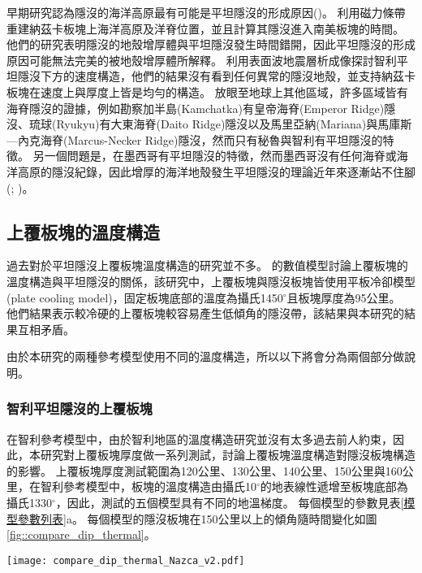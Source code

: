 早期研究認為隱沒的海洋高原最有可能是平坦隱沒的形成原因(\citealp{gutscher2002andean})。
\citet{Skinner2013}利用磁力條帶重建納茲卡板塊上海洋高原及洋脊位置，並且計算其隱沒進入南美板塊的時間。
他們的研究表明隱沒的地殼增厚體與平坦隱沒發生時間錯開，因此平坦隱沒的形成原因可能無法完美的被地殼增厚體所解釋。
\citet{Marot2014}利用表面波地震層析成像探討智利平坦隱沒下方的速度構造，他們的結果沒有看到任何異常的隱沒地殼，並支持納茲卡板塊在速度上與厚度上皆是均勻的構造。
放眼至地球上其他區域，許多區域皆有海脊隱沒的證據，例如勘察加半島(Kamchatka)有皇帝海脊(Emperor Ridge)隱沒、琉球(Ryukyu)有大東海脊(Daito Ridge)隱沒以及馬里亞納(Mariana)與馬庫斯—內克海脊(Marcus-Necker Ridge)隱沒，然而只有秘魯與智利有平坦隱沒的特徵。
另一個問題是，在墨西哥有平坦隱沒的特徵，然而墨西哥沒有任何海脊或海洋高原的隱沒紀錄，因此增厚的海洋地殼發生平坦隱沒的理論近年來逐漸站不住腳(\citealp{schellart2020control}; \citealp{Schellart2021})。

\subsection{上覆板塊的溫度構造}
過去對於平坦隱沒上覆板塊溫度構造的研究並不多。
\citet{Thermal2012}的數值模型討論上覆板塊的溫度構造與平坦隱沒的關係，該研究中，上覆板塊與隱沒板塊皆使用平板冷卻模型(plate cooling model)，固定板塊底部的溫度為攝氏1450$^\circ$且板塊厚度為95公里。
他們結果表示較冷硬的上覆板塊較容易產生低傾角的隱沒帶，該結果與本研究的結果互相矛盾。

由於本研究的兩種參考模型使用不同的溫度構造，所以以下將會分為兩個部分做說明。

\subsubsection{智利平坦隱沒的上覆板塊}
在智利參考模型中，由於智利地區的溫度構造研究並沒有太多過去前人約束，因此，本研究對上覆板塊厚度做一系列測試，討論上覆板塊溫度構造對隱沒板塊構造的影響。
上覆板塊厚度測試範圍為120公里、130公里、140公里、150公里與160公里，在智利參考模型中，板塊的溫度構造由攝氏10$^\circ$的地表線性遞增至板塊底部為攝氏1330$^\circ$，因此，測試的五個模型具有不同的地溫梯度。
每個模型的參數見表\ref{模型參數列表}a。
每個模型的隱沒板塊在150公里以上的傾角隨時間變化如圖\ref{fig::compare_dip_thermal}。

\begin{figure*}[ht!]
    \centering
    \texttt{[image: compare\_dip\_thermal\_Nazca\_v2.pdf]}
    \caption[測試上覆板塊厚度模型之150公里以上隱沒傾角隨時間變化]{測試上覆板塊厚度模型之150公里以上隱沒傾角隨時間變化。}
    \label{fig::compare_dip_thermal}
\end{figure*}

